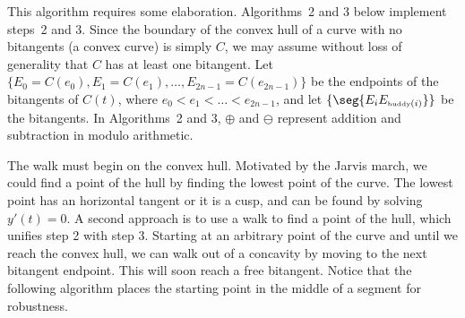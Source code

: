 \documentclass[11pt]{article}
\begin{document}
This algorithm requires some elaboration.
Algorithms~2 and 3 below implement steps~2 and 3.
Since the boundary of the convex hull of a curve with no bitangents (a convex curve)
is simply $C$, we may assume without loss of generality that $C$ has at least one bitangent.
Let $\{E_0 = C(e_0), E_1 = C(e_1), \ldots, E_{2n-1} = C(e_{2n-1})\}$
be the endpoints of the bitangents of $C(t)$, where $e_0 < e_1 < \ldots < e_{2n-1}$, and
let $\{\seg{E_i E_{\mbox{\tiny{buddy}}(i)}}\}$ be the bitangents.
In Algorithms~2 and 3, $\oplus$ and $\ominus$ represent addition and subtraction in modulo arithmetic.

The walk must begin on the convex hull.
Motivated by the Jarvis march, we could find a point of the hull by finding the lowest
point of the curve.
The lowest point has an horizontal tangent or it is a cusp, and can be found by
solving $y'(t) = 0$.
A second approach is to use a walk to find a point of the hull, which unifies step 2 with
step 3.
Starting at an arbitrary point of the curve
and until we reach the convex hull, we can walk out of a concavity
by moving to the next bitangent endpoint.
This will soon reach a free bitangent.
Notice that the following algorithm places the starting point in the middle of a segment 
for robustness.
\end{document}
